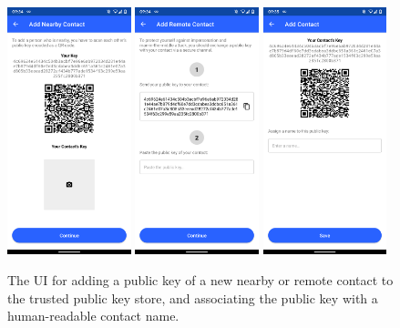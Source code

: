 \begin{figure}
    \centering
    \includegraphics[width=0.32\textwidth]{screens/superapp/add_nearby_contact}
    \includegraphics[width=0.32\textwidth]{screens/superapp/add_remote_contact}
    \includegraphics[width=0.32\textwidth]{screens/superapp/add_contact}
    \caption{The UI for adding a public key of a new nearby or remote contact to the trusted public key store, and associating the public key with a human-readable contact name.}
    \label{manyverse}
\end{figure}


